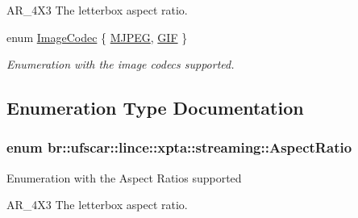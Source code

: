 \begin{DoxyCompactItemize}
\begin{DoxyCompactList}
\begin{DoxyItemize}
\item AR\_\-4X3 The letterbox aspect ratio. 
\end{DoxyItemize}\item\end{DoxyCompactList}\item 
enum \hyperlink{namespacebr_1_1ufscar_1_1lince_1_1xpta_1_1streaming_a2b9d08b18e23472bf55daa690c56169e}{ImageCodec} \{ \hyperlink{namespacebr_1_1ufscar_1_1lince_1_1xpta_1_1streaming_a2b9d08b18e23472bf55daa690c56169eacd96019fd3f269d437ef4d183700a2c9}{MJPEG}, 
\hyperlink{namespacebr_1_1ufscar_1_1lince_1_1xpta_1_1streaming_a2b9d08b18e23472bf55daa690c56169ea867cd641964a9f7c9e8906689d0ab7b2}{GIF}
 \}
\begin{DoxyCompactList}\small\item\em Enumeration with the image codecs supported. \item\end{DoxyCompactList}\end{DoxyCompactItemize}


\subsection{Enumeration Type Documentation}
\hypertarget{namespacebr_1_1ufscar_1_1lince_1_1xpta_1_1streaming_a252e3034c41c058052743c39f2e66103}{
\subsubsection[{AspectRatio}]{\setlength{\rightskip}{0pt plus 5cm}enum {\bf br::ufscar::lince::xpta::streaming::AspectRatio}}}
\label{namespacebr_1_1ufscar_1_1lince_1_1xpta_1_1streaming_a252e3034c41c058052743c39f2e66103}


Enumeration with the Aspect Ratios supported
\begin{DoxyItemize}
\item AR\_\-4X3 The letterbox aspect ratio. 
\end{DoxyItemize}



